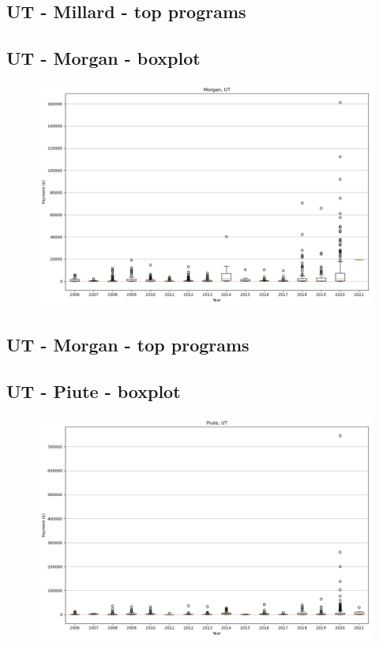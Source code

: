 \subsection*{UT - Millard - top programs}

\newpage
\subsection*{UT - Morgan - boxplot}
\begin{figure}[h]
\centering
\includegraphics[width=7in]{../output/boxplots/counties/Morgan-UT_boxplot.png}
\end{figure}


\subsection*{UT - Morgan - top programs}

\newpage
\subsection*{UT - Piute - boxplot}
\begin{figure}[h]
\centering
\includegraphics[width=7in]{../output/boxplots/counties/Piute-UT_boxplot.png}
\end{figure}


